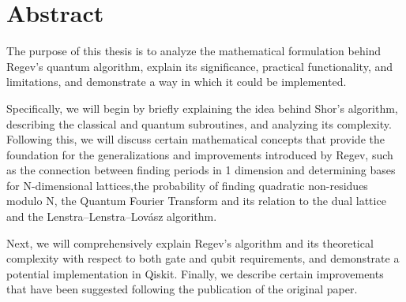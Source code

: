\chapter*{Abstract}

The purpose of this thesis is to analyze the mathematical formulation behind Regev's quantum algorithm, explain its significance, practical functionality, and limitations, and demonstrate a way in which it could be implemented.

Specifically, we will begin by briefly explaining the idea behind Shor's algorithm, describing the classical and quantum subroutines, and analyzing its complexity. Following this, we will discuss certain mathematical concepts that provide the foundation for the generalizations and improvements introduced by Regev, such as the connection between finding periods in 1 dimension and determining bases for N-dimensional lattices,the probability of finding quadratic non-residues modulo N, the Quantum Fourier Transform and its relation to the dual lattice and the Lenstra–Lenstra–Lovász algorithm.

Next, we will comprehensively explain Regev's algorithm and its theoretical complexity with respect to both gate and qubit requirements, and demonstrate a potential implementation in Qiskit. Finally, we describe certain improvements that have been suggested following the publication of the original paper.